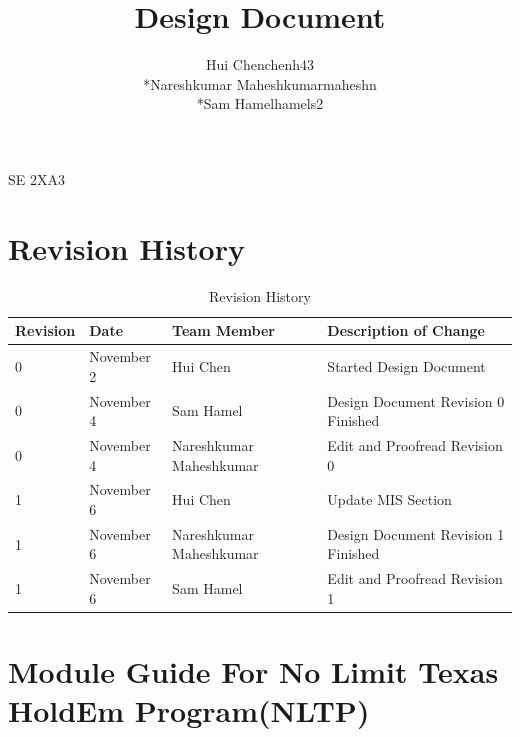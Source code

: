 \documentclass[11pt]{article}
\begin{document}
    \begin{titlepage}
    \title {Design Document}
    \maketitle
        \begin{center}
		SE 2XA3\\
		\author{
		Hui Chen\hspace{128pt}chenh43	
		\\*Nareshkumar Maheshkumar\hspace{35pt}maheshn 
		\\*Sam Hamel\hspace{118pt}hamels2 \\
		}
		\end{center}
    \end{titlepage}
    
    \newpage
    
    \tableofcontents
    \listoffigures
    \listoftables
    
    \newpage
    \section{Revision History}
    \begin{table}[h]
    \caption{Revision History}
    \begin{tabular}{p{4cm}p{2cm}p{2cm}p{4cm}}
    Revision & Date & Team Member & Description of Change\\
    \hline
    0 & November 2 & Hui Chen & Started Design Document\\
    \hline
    0 & November 4 & Sam Hamel & Design Document Revision 0 Finished \\
    \hline
    0 & November 4 & Nareshkumar Maheshkumar & Edit and Proofread Revision 0\\
    \hline
    1 & November 6 & Hui Chen & Update MIS Section\\
    \hline
    1 & November 6 & Nareshkumar Maheshkumar & Design Document Revision 1 Finished\\
    \hline
     1 & November 6 & Sam Hamel & Edit and Proofread Revision 1\\
    \hline
    \end{tabular}
    \end{table}
    \newpage
    \section{Module Guide For No Limit Texas HoldEm Program(NLTP)}
\end{document}
